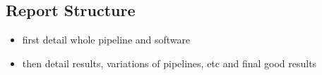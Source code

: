         
        
        
  
    \subsection{Report Structure}
    \label{subsec:bg-intro-structure}
        \begin{itemize}
            \item{first detail whole pipeline and software}
            \item{then detail results, variations of pipelines, etc and final good results}
        \end{itemize}
